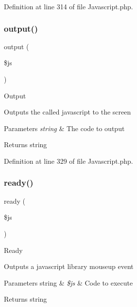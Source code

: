 Definition at line 314 of file Javascript.\+php.

\mbox{\label{class_c_i___javascript_a95bc25e9063b14d257e97e4b205073ba}} 
\subsubsection{\texorpdfstring{output()}{output()}}
{\footnotesize\ttfamily output (\begin{DoxyParamCaption}\item[{}]{\$js }\end{DoxyParamCaption})}

Output

Outputs the called javascript to the screen


\begin{DoxyParams}{Parameters}
{\em string} & The code to output \\
\hline
\end{DoxyParams}
\begin{DoxyReturn}{Returns}
string 
\end{DoxyReturn}


Definition at line 329 of file Javascript.\+php.

\mbox{\label{class_c_i___javascript_a00997e6137ed7dc0de0159ed143a107b}} 
\subsubsection{\texorpdfstring{ready()}{ready()}}
{\footnotesize\ttfamily ready (\begin{DoxyParamCaption}\item[{}]{\$js }\end{DoxyParamCaption})}

Ready

Outputs a javascript library mouseup event


\begin{DoxyParams}[1]{Parameters}
string & {\em \$js} & Code to execute \\
\hline
\end{DoxyParams}
\begin{DoxyReturn}{Returns}
string 
\end{DoxyReturn}


